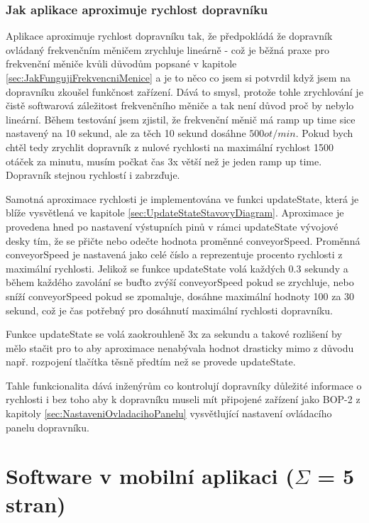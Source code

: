 \subsubsection{Jak aplikace aproximuje rychlost dopravníku}\label{sec:AproximaceRychlostiDopravniku}

Aplikace aproximuje rychlost dopravníku tak, že předpokládá že dopravník ovládaný frekvenčním měničem zrychluje lineárně - což je běžná praxe pro frekvenční měniče kvůli důvodům popsané v kapitole \ref{sec:JakFungujiFrekvencniMenice} a je to něco co jsem si potvrdil když jsem na dopravníku zkoušel funkčnost zařízení. Dává to smysl, protože tohle zrychlování je čistě softwarová záležitost frekvenčního měniče a tak není důvod proč by nebylo lineární. Během testování jsem zjistil, že frekvenční měnič má ramp up time sice nastavený na 10 sekund, ale za těch 10 sekund dosáhne $500 ot/min$. Pokud bych chtěl tedy zrychlit dopravník z nulové rychlosti na maximální rychlost 1500 otáček za minutu, musím počkat čas 3x větší než je jeden ramp up time. Dopravník stejnou rychlostí i zabrzďuje.

Samotná aproximace rychlosti je implementována ve funkci updateState, která je blíže vysvětlená ve kapitole \ref{sec:UpdateStateStavovyDiagram}. Aproximace je provedena hned po nastavení výstupních pinů v rámci updateState vývojové desky tím, že se přičte nebo odečte hodnota proměnné conveyorSpeed. Proměnná conveyorSpeed je nastavená jako celé číslo a reprezentuje procento rychlosti z maximální rychlosti. Jelikož se funkce updateState volá každých 0.3 sekundy a během každého zavolání se buďto zvýší conveyorSpeed pokud se zrychluje, nebo sníží conveyorSpeed pokud se zpomaluje, dosáhne maximální hodnoty 100 za 30 sekund, což je čas potřebný pro dosáhnutí maximální rychlosti dopravníku.

Funkce updateState se volá zaokrouhleně 3x za sekundu a takové rozlišení by mělo stačit pro to aby aproximace nenabývala hodnot drasticky mimo z důvodu např. rozpojení tlačítka těsně předtím než se provede updateState.

Tahle funkcionalita dává inženýrům co kontrolují dopravníky důležité informace o rychlosti i bez toho aby k dopravníku museli mít připojené zařízení jako BOP-2 z kapitoly \ref{sec:NastaveniOvladacihoPanelu} vysvětlující nastavení ovládacího panelu dopravníku.

\section{Software v mobilní aplikaci ($\Sigma$ = 5 stran)}\label{sec:SoftwareVMobilniAplikaci}

